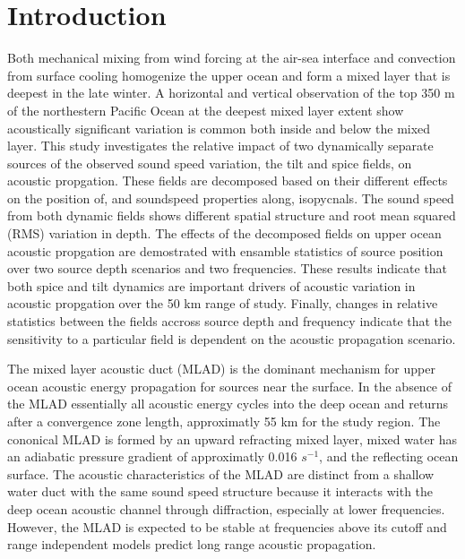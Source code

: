 \documentclass[preprint,NumberedRefs]{JASA}
\begin{document}
\section{\label{sec:intro} Introduction}
Both mechanical mixing from wind forcing at the air-sea interface and convection from surface cooling homogenize the upper ocean and form a mixed layer that is deepest in the late winter\citep{cole2010seasonal}. A horizontal and vertical observation of the top 350 m of the northestern Pacific Ocean at the deepest mixed layer extent show acoustically significant variation is common both inside and below the mixed layer\citep{colosi2020observations}. This study investigates the relative impact of two dynamically separate sources of the observed sound speed variation, the tilt and spice fields, on acoustic propgation. These fields are decomposed based on their different effects on the position of, and soundspeed properties along, isopycnals\cite{dzieciuch2004}. The sound speed from both dynamic fields shows different spatial structure and root mean squared (RMS) variation in depth. The effects of the decomposed fields on upper ocean acoustic propgation are demostrated with ensamble statistics of source position over two source depth scenarios and two frequencies. These results indicate that both spice and tilt dynamics are important drivers of acoustic variation in acoustic propgation over the 50 km range of study. Finally, changes in relative statistics between the fields accross source depth and frequency indicate that the sensitivity to a particular field is dependent on the acoustic propagation scenario.

The mixed layer acoustic duct (MLAD) is the dominant mechanism for upper ocean acoustic energy propagation for sources near the surface. In the absence of the MLAD essentially all acoustic energy cycles into the deep ocean and returns after a convergence zone length\cite{jensen2011computational}, approximatly 55 km for the study region. The cononical MLAD is formed by an upward refracting mixed layer, mixed water has an adiabatic pressure gradient of approximatly 0.016 $s^{-1}$, and the reflecting ocean surface. The acoustic characteristics of the MLAD are distinct from a shallow water duct with the same sound speed structure because it interacts with the deep ocean acoustic channel through diffraction\citep{porter93}, especially at lower frequencies. However, the MLAD is expected to be stable at frequencies above its cutoff\citep{Urick1982Prop} and range independent models predict long range acoustic propagation.
\end{document}
